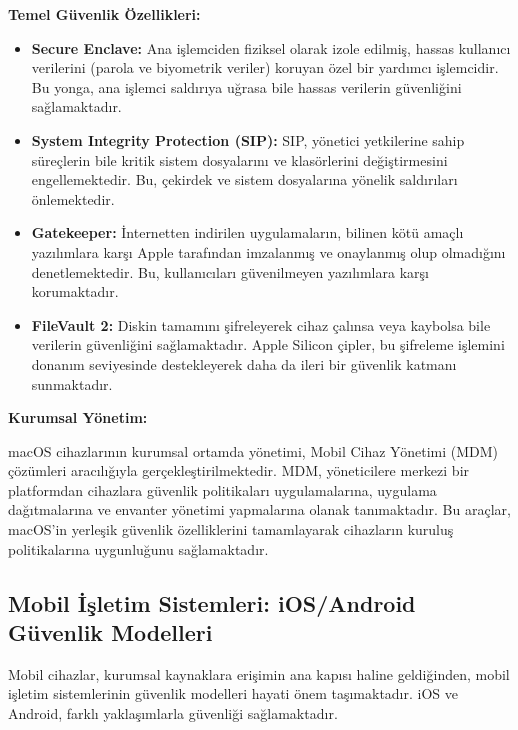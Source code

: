 \textbf{Temel Güvenlik Özellikleri:}
\begin{itemize}
    \item \textbf{Secure Enclave:} Ana işlemciden fiziksel olarak izole edilmiş, hassas kullanıcı verilerini (parola ve biyometrik veriler) koruyan özel bir yardımcı işlemcidir. Bu yonga, ana işlemci saldırıya uğrasa bile hassas verilerin güvenliğini sağlamaktadır.
    \item \textbf{System Integrity Protection (SIP):} SIP, yönetici yetkilerine sahip süreçlerin bile kritik sistem dosyalarını ve klasörlerini değiştirmesini engellemektedir. Bu, çekirdek ve sistem dosyalarına yönelik saldırıları önlemektedir.
    \item \textbf{Gatekeeper:} İnternetten indirilen uygulamaların, bilinen kötü amaçlı yazılımlara karşı Apple tarafından imzalanmış ve onaylanmış olup olmadığını denetlemektedir. Bu, kullanıcıları güvenilmeyen yazılımlara karşı korumaktadır.
    \item \textbf{FileVault 2:} Diskin tamamını şifreleyerek cihaz çalınsa veya kaybolsa bile verilerin güvenliğini sağlamaktadır. Apple Silicon çipler, bu şifreleme işlemini donanım seviyesinde destekleyerek daha da ileri bir güvenlik katmanı sunmaktadır.
\end{itemize}

\textbf{Kurumsal Yönetim:}

macOS cihazlarının kurumsal ortamda yönetimi, Mobil Cihaz Yönetimi (MDM) çözümleri aracılığıyla gerçekleştirilmektedir. MDM, yöneticilere merkezi bir platformdan cihazlara güvenlik politikaları uygulamalarına, uygulama dağıtmalarına ve envanter yönetimi yapmalarına olanak tanımaktadır. Bu araçlar, macOS'in yerleşik güvenlik özelliklerini tamamlayarak cihazların kuruluş politikalarına uygunluğunu sağlamaktadır.

\subsection{Mobil İşletim Sistemleri: iOS/Android Güvenlik Modelleri}

Mobil cihazlar, kurumsal kaynaklara erişimin ana kapısı haline geldiğinden, mobil işletim sistemlerinin güvenlik modelleri hayati önem taşımaktadır. iOS ve Android, farklı yaklaşımlarla güvenliği sağlamaktadır.

